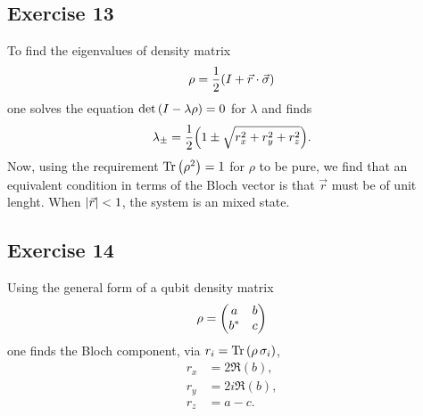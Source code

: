 \subsection{Exercise 13}\noindent
To find the eigenvalues of density matrix
\begin{align}
\rho=\frac{1}{2}\qty(I+\vec r\cdot\vec\sigma)
\end{align}
one solves the equation $\det\qty(I-\lambda\rho)=0$ for $\lambda$ and finds
\begin{align}
\lambda_{\pm}=\frac{1}{2}\qty(1\pm\sqrt{r_x^2+r_y^2+r_z^2}).
\end{align}
Now, using the requirement $\Tr\qty(\rho^2)=1$ for $\rho$ to be pure, we find 
that an equivalent condition in terms of the Bloch vector is that $\vec r$ must 
be of unit lenght. When $\abs{\vec r}<1$, the system is an mixed state.

\subsection{Exercise 14}\noindent
Using the general form of a qubit density matrix
\begin{align}
\rho=\mqty(a&b\\b^*&c)
\end{align}
one finds the Bloch component, via $r_i=\Tr \qty(\rho\,\sigma_i)$,
\begin{subequations}
\begin{align}
r_x&=2\Re(b),\\
r_y&=2i\Re(b),\\
r_z&=a-c.
\end{align}
\end{subequations}